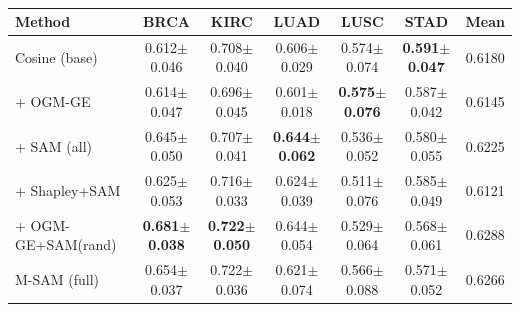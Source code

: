 \begin{table}[t]
\centering
\caption{}
\begin{tabular}{lcccccc}
\toprule
Method & BRCA & KIRC & LUAD & LUSC & STAD & Mean \\
\midrule
Cosine (base) & 0.612$\pm$0.046 & 0.708$\pm$0.040 & 0.606$\pm$0.029 & 0.574$\pm$0.074 & \textbf{0.591$\pm$0.047} & 0.6180 \\
+ OGM-GE & 0.614$\pm$0.047 & 0.696$\pm$0.045 & 0.601$\pm$0.018 & \textbf{0.575$\pm$0.076} & 0.587$\pm$0.042 & 0.6145 \\
+ SAM (all) & 0.645$\pm$0.050 & 0.707$\pm$0.041 & \textbf{0.644$\pm$0.062} & 0.536$\pm$0.052 & 0.580$\pm$0.055 & 0.6225 \\
+ Shapley+SAM & 0.625$\pm$0.053 & 0.716$\pm$0.033 & 0.624$\pm$0.039 & 0.511$\pm$0.076 & 0.585$\pm$0.049 & 0.6121 \\
+ OGM-GE+SAM(rand) & \textbf{0.681$\pm$0.038} & \textbf{0.722$\pm$0.050} & 0.644$\pm$0.054 & 0.529$\pm$0.064 & 0.568$\pm$0.061 & 0.6288 \\
M-SAM (full) & 0.654$\pm$0.037 & 0.722$\pm$0.036 & 0.621$\pm$0.074 & 0.566$\pm$0.088 & 0.571$\pm$0.052 & 0.6266 \\
\bottomrule
\end{tabular}
\end{table}